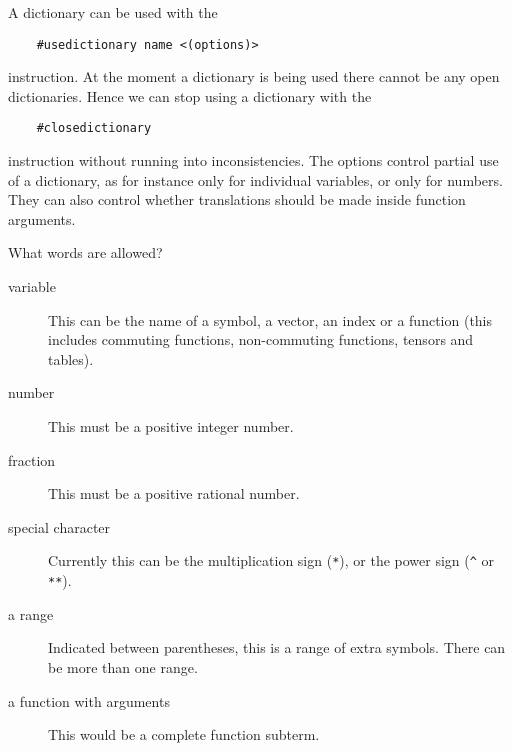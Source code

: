 A dictionary can be used with the
\begin{verbatim}
    #usedictionary name <(options)>
\end{verbatim}
instruction. At the moment a dictionary is being used there cannot be any 
open dictionaries. Hence we can stop using a dictionary with the
\begin{verbatim}
    #closedictionary
\end{verbatim}
instruction without running into inconsistencies. 
The options control partial use of a dictionary, as for instance only for 
individual variables, or only for numbers. They can also control whether 
translations should be made inside function arguments.

What words are allowed?
\begin{description}
\item[variable] This can be the name of a symbol, a vector, an index or a 
function (this includes commuting functions, non-commuting functions, 
tensors and tables).
\item[number] This must be a positive integer number.
\item[fraction] This must be a positive rational number.
\item[special character] Currently this can be the multiplication sign 
(\verb:*:), or the power sign (\verb:^: or \verb:**:).
\item[a range] Indicated between parentheses, this is a range 
of extra symbols. There can be more than one range.
\item[a function with arguments] This would be a complete function subterm. 
\end{description}


